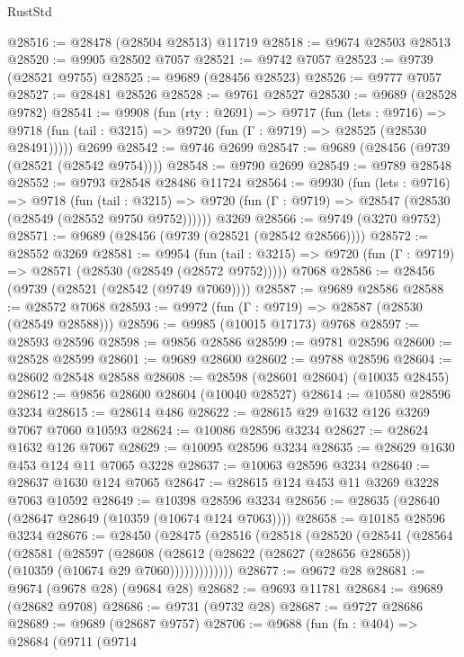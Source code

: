 \begin{lexlean}{RustStd}
\begin{coremodule}
@28516 := @28478 (@28504 @28513) @11719
@28518 := @9674 @28503 @28513
@28520 := @9905 @28502 @7057
@28521 := @9742 @7057
@28523 := @9739 (@28521 @9755)
@28525 := @9689 (@28456 @28523)
@28526 := @9777 @7057
@28527 := @28481 @28526
@28528 := @9761 @28527
@28530 := @9689 (@28528 @9782)
@28541 := @9908
    (fun (rty : @2691) =>
    @9717
      (fun (lets : @9716) =>
      @9718 (fun (tail : @3215) => @9720 (fun (Γ : @9719) => @28525 (@28530 @28491)))))
    @2699
@28542 := @9746 @2699
@28547 := @9689 (@28456 (@9739 (@28521 (@28542 @9754))))
@28548 := @9790 @2699
@28549 := @9789 @28548
@28552 := @9793 @28548 @28486 @11724
@28564 := @9930
    (fun (lets : @9716) =>
    @9718
      (fun (tail : @3215) =>
      @9720 (fun (Γ : @9719) => @28547 (@28530 (@28549 (@28552 @9750 @9752))))))
    @3269
@28566 := @9749 (@3270 @9752)
@28571 := @9689 (@28456 (@9739 (@28521 (@28542 @28566))))
@28572 := @28552 @3269
@28581 := @9954
    (fun (tail : @3215) => @9720 (fun (Γ : @9719) => @28571 (@28530 (@28549 (@28572 @9752)))))
    @7068
@28586 := @28456 (@9739 (@28521 (@28542 (@9749 @7069))))
@28587 := @9689 @28586
@28588 := @28572 @7068
@28593 := @9972 (fun (Γ : @9719) => @28587 (@28530 (@28549 @28588)))
@28596 := @9985 (@10015 @17173) @9768
@28597 := @28593 @28596
@28598 := @9856 @28586
@28599 := @9781 @28596
@28600 := @28528 @28599
@28601 := @9689 @28600
@28602 := @9788 @28596
@28604 := @28602 @28548 @28588
@28608 := @28598 (@28601 @28604) (@10035 @28455)
@28612 := @9856 @28600 @28604 (@10040 @28527)
@28614 := @10580 @28596 @3234
@28615 := @28614 @486
@28622 := @28615 @29 @1632 @126 @3269 @7067 @7060 @10593
@28624 := @10086 @28596 @3234
@28627 := @28624 @1632 @126 @7067
@28629 := @10095 @28596 @3234
@28635 := @28629 @1630 @453 @124 @11 @7065 @3228
@28637 := @10063 @28596 @3234
@28640 := @28637 @1630 @124 @7065
@28647 := @28615 @124 @453 @11 @3269 @3228 @7063 @10592
@28649 := @10398 @28596 @3234
@28656 := @28635 (@28640 (@28647 @28649 (@10359 (@10674 @124 @7063))))
@28658 := @10185 @28596 @3234
@28676 := @28450
    (@28475
      (@28516
        (@28518
          (@28520
            (@28541
              (@28564
                (@28581
                  (@28597
                    (@28608
                      (@28612
                        (@28622 (@28627 (@28656 @28658)) (@10359 (@10674 @29 @7060)))))))))))))
@28677 := @9672 @28
@28681 := @9674 (@9678 @28) (@9684 @28)
@28682 := @9693 @11781
@28684 := @9689 (@28682 @9708)
@28686 := @9731 (@9732 @28)
@28687 := @9727 @28686
@28689 := @9689 (@28687 @9757)
@28706 := @9688
    (fun (fn : @404) =>
    @28684
      (@9711
        (@9714

\end{coremodule}
\end{lexlean}
